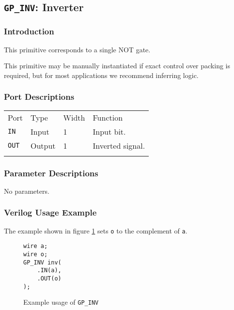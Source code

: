\documentclass[11pt]{article}
\newcommand{\tokenstyle}[1]{\texttt{#1}}
\newcommand{\wirestyle}[1]{\texttt{#1}}
\newcommand{\whenstyle}[1]{{\fontseries{sb}\selectfont#1}}
\newcommand{\thinhline}{\Xhline{1\arrayrulewidth}}
\newcommand{\thickhline}{\Xhline{2.5\arrayrulewidth}}
\begin{document}
\pagebreak
\subsection{\tokenstyle{GP\_INV}: Inverter}
\label{gp-inv}

\subsubsection{Introduction}
This primitive corresponds to a single NOT gate.

This primitive may be manually instantiated if exact control over packing is required, but for most applications we
recommend inferring logic.

\subsubsection{Port Descriptions}

\begin{tabularx}{\textwidth}{lllX}
\thinhline
\whenstyle{Port} & \whenstyle{Type} & \whenstyle{Width} & \whenstyle{Function} \\
\thickhline
\tokenstyle{IN} & Input & 1 & Input bit. \\
\thinhline
\tokenstyle{OUT} & Output & 1 & Inverted signal. \\
\thinhline
\end{tabularx}

\subsubsection{Parameter Descriptions}

No parameters.

\subsubsection{Verilog Usage Example}

The example shown in figure \ref{gp-inv-example} sets \wirestyle{o} to the complement of \wirestyle{a}.

\begin{figure}[h]
\begin{lstlisting}
wire a;
wire o;
GP_INV inv(
	.IN(a),
	.OUT(o)
);
\end{lstlisting}
\caption{Example usage of \tokenstyle{GP\_INV}}
\label{gp-inv-example}
\end{figure}

\end{document}
